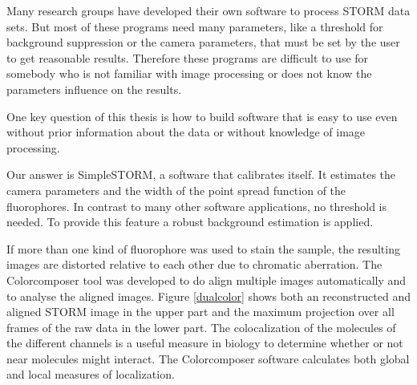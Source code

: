 Many research groups have developed their own software to process STORM data sets. But most of these programs need many parameters, like a threshold for background suppression or the camera parameters, that must be set by the user to get reasonable results. Therefore these programs are difficult to use for somebody who is not familiar with image processing or does not know the parameters influence on the results.\newline

One key question of this thesis is how to build software that is easy to use even without prior information about the data or without knowledge of image processing. \newline

Our answer is SimpleSTORM, a software that calibrates itself. It estimates the camera parameters and the width of the point spread function of the fluorophores. In contrast to many other software applications, no threshold is needed. To provide this feature a robust background estimation is applied.\newline

If more than one kind of fluorophore was used to stain the sample, the resulting images are distorted relative to each other due to chromatic aberration. The Colorcomposer tool was developed to do align multiple images automatically and to analyse the aligned images. Figure \ref{dualcolor} shows both an reconstructed and aligned STORM image in the upper part and the maximum projection over all frames of the raw data in the lower part. The colocalization of the molecules of the different channels is a useful measure in biology to determine whether or not near molecules might interact. The Colorcomposer software calculates both global and local measures of localization.

